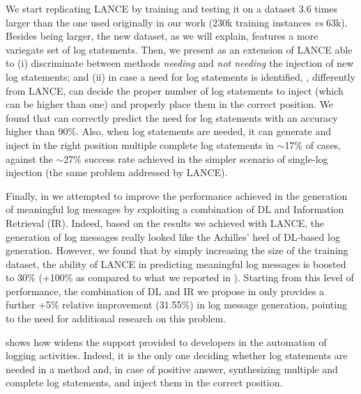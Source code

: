 We start replicating LANCE by training and testing it on a dataset 3.6 times larger than the one used originally in our work \cite{mastropaolo2022using} (230k training instances \emph{vs} 63k). Besides being larger, the new dataset, as we will explain, features a more variegate set of log statements. Then, we present \approach as an extension of LANCE able to (i) discriminate between methods \emph{needing} and \emph{not needing} the injection of new log statements; and (ii) in case a need for log statements is identified, \approach, differently from LANCE, can decide the proper number of log statements to inject (which can be higher than one) and properly place them in the correct position. We found that \approach can correctly predict the need for log statements with an accuracy higher than 90\%. Also, when log statements are needed, it can generate and inject in the right position multiple complete log statements in $\sim$17\% of cases, against the $\sim$27\% success rate achieved in the simpler scenario of single-log injection (\ie the same problem addressed by LANCE).   

Finally, in \approach we attempted to improve the performance achieved in the generation of meaningful log messages by exploiting a combination of DL and Information Retrieval (IR). Indeed, based on the results we achieved with LANCE, the generation of log messages really looked like the Achilles' heel of DL-based log generation. However, we found that by simply increasing the size of the training dataset, the ability of LANCE in predicting meaningful log messages is boosted to 30\% (+100\% as compared to what we reported in \cite{mastropaolo2022using}). Starting from this level of performance, the combination of DL and IR we propose in \approach only provides a further +5\% relative improvement (31.55\%) in log message generation, pointing to the need for additional research on this problem.

 shows how \approach widens the support provided to developers in the automation of logging activities. Indeed, it is the only one deciding whether log statements are needed in a method and, in case of positive answer, synthesizing multiple and complete log statements, and inject them in the correct position. 

